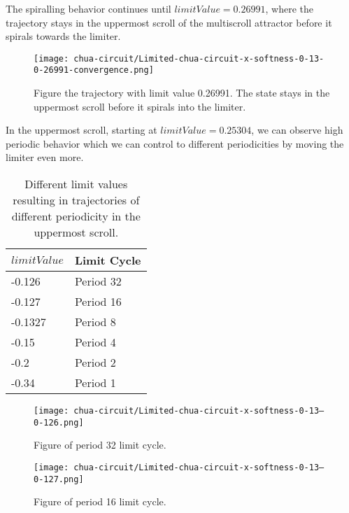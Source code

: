 \documentclass[main]{subfiles}
\begin{document}
The spiralling behavior continues until \(limitValue=0.26991\), where the trajectory stays in the uppermost scroll of the multiscroll attractor before it spirals towards the limiter.

\begin{figure}[H]
\centering
\texttt{[image: chua-circuit/Limited-chua-circuit-x-softness-0-13-0-26991-convergence.png]}
\caption[Figure of trajectory with limit value 0.26991.]{Figure the trajectory with limit value 0.26991. The state stays in the uppermost scroll before it spirals into the limiter.}
\label{figure:x-0.13-upper-scroll-trajectory}
\end{figure}

In the uppermost scroll, starting at \(limitValue=0.25304\), we can observe high periodic behavior which we can control to different periodicities by moving the limiter even more. 

\begin{table}[H]
\renewcommand{\arraystretch}{1.2}
\center
\begin{tabular}{@{}ll@{}}
	\toprule
   \(limitValue\) & Limit Cycle\\
   \midrule
   -0.126 & Period 32 \\
   -0.127 & Period 16 \\
   -0.1327 & Period 8 \\ 
   -0.15 & Period 4 \\
   -0.2  & Period 2 \\
   -0.34 & Period 1 \\
   \bottomrule
\end{tabular}
\caption[Limiter values for periodic trajectories for for an x self-limiting limiter with softness 0.13]{Different limit values resulting in trajectories of different periodicity in the uppermost scroll.}
\label{table:x-0.13-periodicities}
\end{table}

\begin{figure}[H]
\centering
\texttt{[image: chua-circuit/Limited-chua-circuit-x-softness-0-13--0-126.png]}
\caption[Figure of period 32 limit cycle]{Figure of period 32 limit cycle.}
\label{figure:x-0.13-32-limit-cycle-upperscroll-trajectory}
\end{figure}

\begin{figure}[H]
\centering
\texttt{[image: chua-circuit/Limited-chua-circuit-x-softness-0-13--0-127.png]}
\caption[Figure of period 16 limit cycle]{Figure of period 16 limit cycle.}
\label{figure:x-0.13-16-limit-cycle-upperscroll-trajectory}
\end{figure}
\end{document}
